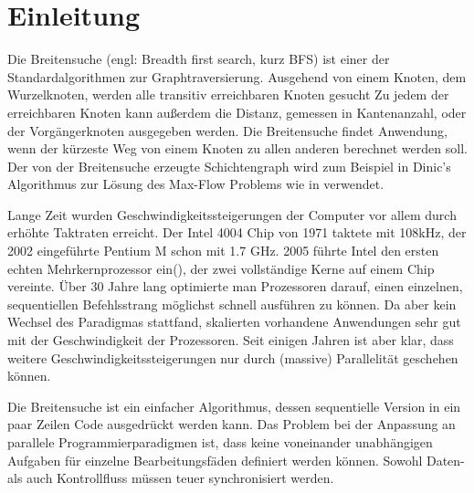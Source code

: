 \chapter{Einleitung}
\label{ch:einleitung}

Die Breitensuche (engl: Breadth first search, kurz BFS) ist einer der Standardalgorithmen zur Graphtraversierung. Ausgehend von einem Knoten, dem Wurzelknoten, werden alle transitiv erreichbaren Knoten gesucht Zu jedem der erreichbaren Knoten kann außerdem die Distanz, gemessen in Kantenanzahl, oder der Vorgängerknoten ausgegeben werden. Die Breitensuche findet Anwendung, wenn der kürzeste Weg von einem Knoten zu allen anderen berechnet werden soll. Der von der Breitensuche erzeugte Schichtengraph wird zum Beispiel in Dinic's Algorithmus zur Lösung des Max-Flow Problems wie in \cite{Dinitz:2006} verwendet. 

Lange Zeit wurden Geschwindigkeitssteigerungen der Computer vor allem durch erhöhte Taktraten erreicht. Der Intel 4004 Chip von 1971 taktete mit 108kHz, der 2002 eingeführte Pentium M schon mit 1.7 GHz. 2005 führte Intel den ersten echten Mehrkernprozessor ein(\cite{Intel:2006:Online}), der zwei vollständige Kerne auf einem Chip vereinte. Über 30 Jahre lang optimierte man Prozessoren darauf, einen einzelnen, sequentiellen Befehlsstrang möglichst schnell ausführen zu können. Da aber kein Wechsel des Paradigmas stattfand, skalierten vorhandene Anwendungen sehr gut mit der Geschwindigkeit der Prozessoren. Seit einigen Jahren ist aber klar, dass weitere Geschwindigkeitssteigerungen nur durch (massive) Parallelität geschehen können.  

Die Breitensuche ist ein einfacher Algorithmus, dessen sequentielle Version in ein paar Zeilen Code ausgedrückt werden kann. Das Problem bei der Anpassung an parallele Programmierparadigmen ist, dass keine voneinander unabhängigen Aufgaben für einzelne Bearbeitungsfäden definiert werden können. Sowohl Daten- als auch Kontrollfluss müssen teuer synchronisiert werden.

